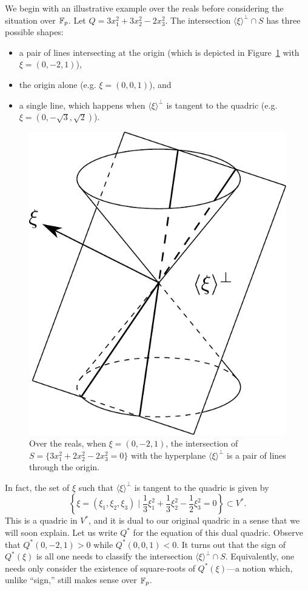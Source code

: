 We begin with an illustrative example over the reals before considering the situation over $\mathbb{F}_p$. Let $Q = 3x_1^2 + 3x_2^2 - 2x_3^2$.
The intersection $\langle \xi \rangle^\bot \cap S$ has three possible shapes:
\begin{itemize}
	\item a pair of lines intersecting at the origin (which is depicted in Figure~\ref{fig:conic-with-plane} with $\xi = (0,-2,1)$),
	\item the origin alone (e.g. $\xi = (0,0,1)$), and
	\item a single line, which happens when $\langle \xi \rangle^\bot$ is tangent to the quadric (e.g. $\xi = (0,-\sqrt{3},\sqrt{2})$).
\end{itemize}
\begin{figure}[h]
	\centering
	\includegraphics[width=0.6\linewidth]{conic-with-plane}
	\caption{Over the reals, when $\xi=(0,-2,1)$, the intersection of $S = \{3x_1^2 + 2x_2^2 - 2x_3^2 = 0\}$ with the hyperplane $\langle \xi \rangle^\bot$ is a pair of lines through the origin.}
	\label{fig:conic-with-plane}
\end{figure}
In fact, the set of $\xi$ such that $\langle \xi \rangle^\bot$ is tangent to the quadric is given by
\[
	\left\{ \xi = (\xi_1,\xi_2,\xi_3) \mid \frac{1}{3} \xi_1^2 + \frac{1}{3} \xi_2^2 - \frac{1}{2} \xi_3^2 = 0 \right\} \subset V^*.
\]
This is a quadric in $V^*$, and it is dual to our original quadric in a sense that we will soon explain. Let us write $Q^*$ for the equation of this dual quadric. Observe that $Q^*(0,-2,1) > 0$ while $Q^*(0,0,1) < 0$. It turns out that the sign of $Q^*(\xi)$ is all one needs to classify the intersection $\langle \xi \rangle^\bot \cap S$. Equivalently, one needs only consider the existence of square-roots of $Q^*(\xi)$---a notion which, unlike ``sign,'' still makes sense over $\mathbb{F}_p$.

